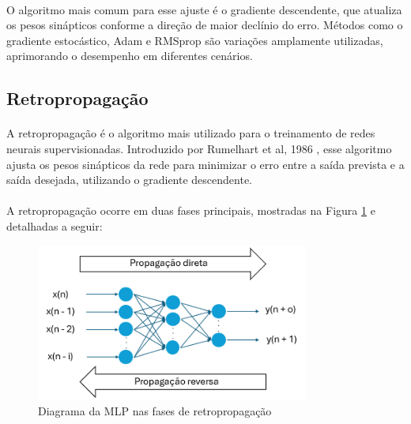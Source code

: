 \paragraph{} O algoritmo mais comum para esse ajuste é o gradiente descendente, que atualiza os pesos sinápticos conforme a direção de maior declínio do erro. Métodos como o gradiente estocástico, Adam e RMSprop são variações amplamente utilizadas, aprimorando o desempenho em diferentes cenários.

\subsection{Retropropagação}

\paragraph{} A retropropagação  é o algoritmo mais utilizado para o treinamento de redes neurais supervisionadas. Introduzido por Rumelhart et al, 1986 \cite{rumelhart1986learning}, esse algoritmo ajusta os pesos sinápticos da rede para minimizar o erro entre a saída prevista e a saída desejada, utilizando o gradiente descendente.

\paragraph{} A retropropagação ocorre em duas fases principais, mostradas na Figura \ref{fig:mlp_diagram_backprop} e detalhadas a seguir:

\begin{figure}
	\begin{center}
		\includegraphics[width=0.8\textwidth]{figuras/mlp_diagram_backprop.png}
		\caption{Diagrama da \acs{MLP} nas fases de retropropagação}
		\label{fig:mlp_diagram_backprop}
	\end{center}
\end{figure}

